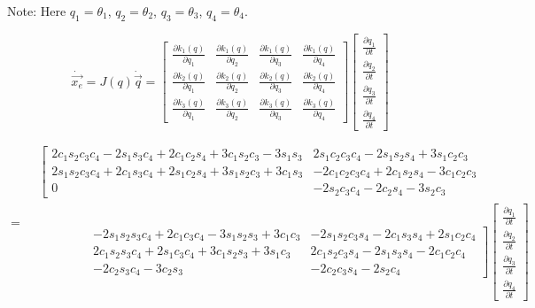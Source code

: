 \documentclass{article}
\begin{document}
\begin{center}
{\large
Note: Here $q_{1}=\theta_{1}$, $q_{2}=\theta_{2}$, $q_{3}=\theta_{3}$, $q_{4}=\theta_{4}$.
}
\end{center}
{\Large
\[
\dot{\vec{x_{e}}}=J(q)\dot{\vec{q}}
=
\begin{bmatrix}
\frac{\partial k_{1}(q)}{\partial q_{1}} &
\frac{\partial k_{1}(q)}{\partial q_{2}} &
\frac{\partial k_{1}(q)}{\partial q_{3}} & 
\frac{\partial k_{1}(q)}{\partial q_{4}} \\
\frac{\partial k_{2}(q)}{\partial q_{1}} & 
\frac{\partial k_{2}(q)}{\partial q_{2}} & 
\frac{\partial k_{2}(q)}{\partial q_{3}} & 
\frac{\partial k_{2}(q)}{\partial q_{4}} \\
\frac{\partial k_{3}(q)}{\partial q_{1}} & 
\frac{\partial k_{3}(q)}{\partial q_{2}} & 
\frac{\partial k_{3}(q)}{\partial q_{3}} & 
\frac{\partial k_{3}(q)}{\partial q_{4}}
\end{bmatrix}
\begin{bmatrix}
\frac{\partial q_{1}}{\partial t} \\
\frac{\partial q_{2}}{\partial t} \\
\frac{\partial q_{3}}{\partial t} \\
\frac{\partial q_{4}}{\partial t} 
\end{bmatrix}
\]

\begin{equation}
=
\!\begin{aligned}
&
\left[\begin{matrix}
2c_{1}s_{2}c_{3}c_{4} - 2s_{1}s_{3}c_{4} + 2c_{1}c_{2}s_{4} + 3c_{1}s_{2}c_{3} - 3s_{1}s_{3} &
2s_{1}c_{2}c_{3}c_{4} - 2s_{1}s_{2}s_{4} + 3s_{1}c_{2}c_{3} \\
2s_{1}s_{2}c_{3}c_{4} + 2c_{1}s_{3}c_{4} + 2s_{1}c_{2}s_{4} + 3s_{1}s_{2}c_{3} + 3c_{1}s_{3} &
-2c_{1}c_{2}c_{3}c_{4} + 2c_{1}s_{2}s_{4} - 3c_{1}c_{2}c_{3}\\
0 &
-2s_{2}c_{3}c_{4} - 2c_{2}s_{4} - 3s_{2}c_{3}
\end{matrix}\right.\\
&\qquad\qquad
\left.\begin{matrix}
-2s_{1}s_{2}s_{3}c_{4} + 2c_{1}c_{3}c_{4} - 3s_{1}s_{2}s_{3} + 3c_{1}c_{3} &
-2s_{1}s_{2}c_{3}s_{4} - 2c_{1}s_{3}s_{4} + 2s_{1}c_{2}c_{4}  \\
2c_{1}s_{2}s_{3}c_{4} + 2s_{1}c_{3}c_{4} + 3c_{1}s_{2}s_{3} + 3s_{1}c_{3} &
2c_{1}s_{2}c_{3}s_{4} - 2s_{1}s_{3}s_{4} - 2c_{1}c_{2}c_{4}\\
-2c_{2}s_{3}c_{4} - 3c_{2}s_{3} &
-2c_{2}c_{3}s_{4} - 2s_{2}c_{4}
\end{matrix}\right]
\begin{bmatrix}
\frac{\partial q_{1}}{\partial t} \\
\frac{\partial q_{2}}{\partial t} \\
\frac{\partial q_{3}}{\partial t} \\
\frac{\partial q_{4}}{\partial t} 
\end{bmatrix}
\end{aligned}
\end{equation}
}
\end{document}
